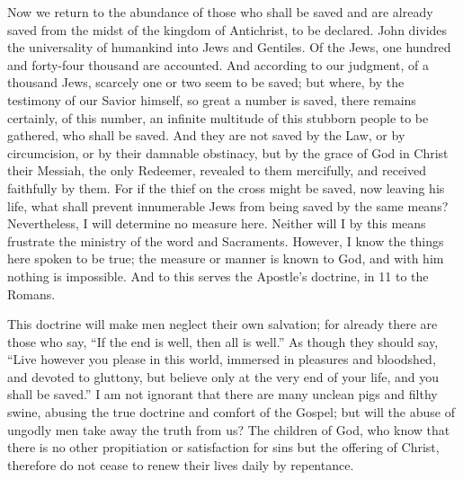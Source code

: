 Now we return to the abundance of those who shall be saved and are already saved from the midst of the kingdom of Antichrist, to be declared. John divides the universality of humankind into Jews and Gentiles. Of the Jews, one hundred and forty-four thousand are accounted. And according to our judgment, of a thousand Jews, scarcely one or two seem to be saved; but where, by the testimony of our Savior himself, so great a number is saved, there remains certainly, of this number, an infinite multitude of this stubborn people to be gathered, who shall be saved. And they are not saved by the Law, or by circumcision, or by their damnable obstinacy, but by the grace of God in Christ their Messiah, the only Redeemer, revealed to them mercifully, and received faithfully by them. For if the thief on the cross might be saved, now leaving his life, what shall prevent innumerable Jews from being saved by the same means? Nevertheless, I will determine no measure here. Neither will I by this means frustrate the ministry of the word and Sacraments. However, I know the things here spoken to be true; the measure or manner is known to God, and with him nothing is impossible. And to this serves the Apostle’s doctrine, in 11 to the Romans.

This doctrine will make men neglect their own salvation; for already there are those who say, “If the end is well, then all is well.” As though they should say, “Live however you please in this world, immersed in pleasures and bloodshed, and devoted to gluttony, but believe only at the very end of your life, and you shall be saved.” I am not ignorant that there are many unclean pigs and filthy swine, abusing the true doctrine and comfort of the Gospel; but will the abuse of ungodly men take away the truth from us? The children of God, who know that there is no other propitiation or satisfaction for sins but the offering of Christ, therefore do not cease to renew their lives daily by repentance.

